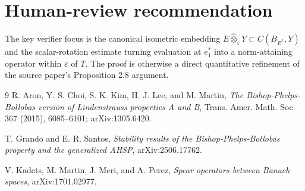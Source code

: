 \documentclass[11pt]{article}
\newcommand{\eps}{\varepsilon}
\newcommand{\ot}{\widehat{\otimes}_{\varepsilon}}
\begin{document}
\section*{Human-review recommendation}

The key verifier focus is the canonical isometric embedding
$E\ot Y\subset C(B_{E^\ast},Y)$ and the scalar-rotation estimate turning
evaluation at $e_1^\ast$ into a norm-attaining operator within $\eps$ of $T$.
The proof is otherwise a direct quantitative refinement of the source paper's
Proposition 2.8 argument.

\begin{thebibliography}{9}
R. Aron, Y. S. Choi, S. K. Kim, H. J. Lee, and M. Martin,
\emph{The Bishop-Phelps-Bollobas version of Lindenstrauss properties A and B},
Trans. Amer. Math. Soc. 367 (2015), 6085--6101; arXiv:1305.6420.

T. Grando and E. R. Santos,
\emph{Stability results of the Bishop-Phelps-Bollobas property and the
generalized AHSP}, arXiv:2506.17762.

V. Kadets, M. Martin, J. Meri, and A. Perez,
\emph{Spear operators between Banach spaces}, arXiv:1701.02977.
\end{thebibliography}
\end{document}
